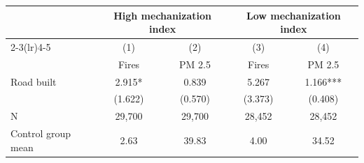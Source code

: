 {
\def\sym#1{\ifmmode^{#1}\else\(^{#1}\)\fi}
\begin{tabular}{l*{4}{c}}
\hline\hline
                         &\multicolumn{2}{c}{High mechanization index}&\multicolumn{2}{c}{Low mechanization index}\\\cmidrule(lr){2-3}\cmidrule(lr){4-5}
                         &\multicolumn{1}{c}{(1)}&\multicolumn{1}{c}{(2)}&\multicolumn{1}{c}{(3)}&\multicolumn{1}{c}{(4)}\\
                         &\multicolumn{1}{c}{Fires}&\multicolumn{1}{c}{PM 2.5}&\multicolumn{1}{c}{Fires}&\multicolumn{1}{c}{PM 2.5}\\
\hline
Road built               &       2.915*  &       0.839   &       5.267   &       1.166***\\
                         &     (1.622)   &     (0.570)   &     (3.373)   &     (0.408)   \\
\hline
N                        &      29,700   &      29,700   &      28,452   &      28,452   \\
Control group mean       &        2.63   &       39.83   &        4.00   &       34.52   \\
\hline\hline
\end{tabular}
}
